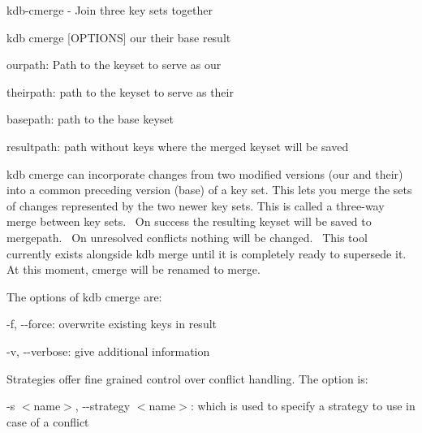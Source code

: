 kdb-\/cmerge -\/ Join three key sets together

{\ttfamily kdb cmerge \mbox{[}O\+P\+T\+I\+O\+NS\mbox{]} our their base result}


\begin{DoxyItemize}
\item ourpath\+: Path to the keyset to serve as {\ttfamily our}~\newline

\item theirpath\+: path to the keyset to serve as {\ttfamily their}~\newline

\item basepath\+: path to the {\ttfamily base} keyset~\newline

\item resultpath\+: path without keys where the merged keyset will be saved~\newline

\end{DoxyItemize}

{\ttfamily kdb cmerge} can incorporate changes from two modified versions (our and their) into a common preceding version (base) of a key set. This lets you merge the sets of changes represented by the two newer key sets. This is called a three-\/way merge between key sets.~\newline
 On success the resulting keyset will be saved to mergepath.~\newline
 On unresolved conflicts nothing will be changed.~\newline
 This tool currently exists alongside {\ttfamily kdb merge} until it is completely ready to supersede it. At this moment, cmerge will be renamed to merge.

The options of {\ttfamily kdb cmerge} are\+:


\begin{DoxyItemize}
\item {\ttfamily -\/f}, {\ttfamily -\/-\/force}\+: overwrite existing keys in {\ttfamily result}
\item {\ttfamily -\/v}, {\ttfamily -\/-\/verbose}\+: give additional information
\end{DoxyItemize}

Strategies offer fine grained control over conflict handling. The option is\+:


\begin{DoxyItemize}
\item {\ttfamily -\/s $<$name$>$}, {\ttfamily -\/-\/strategy $<$name$>$}\+: which is used to specify a strategy to use in case of a conflict
\end{DoxyItemize}

